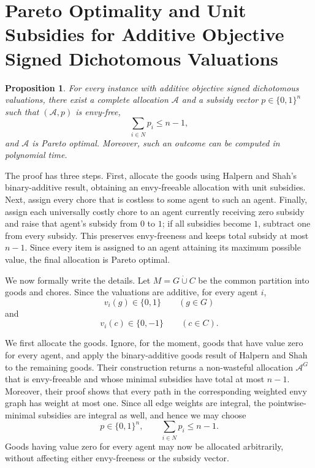\documentclass[11pt]{article}
\makeatletter
\theoremstyle{plain}
\newtheorem{proposition}{Proposition}
\theoremstyle{plain}
\renewenvironment{proof}[1][\proofname]{\par
  \pushQED{\qed}%
  \normalfont \topsep6\p@\@plus6\p@\relax
  \trivlist
  \item[\hskip\labelsep\bfseries #1\@addpunct{}]\ignorespaces
}{%
  \popQED\endtrivlist\@endpefalse
}
\newcommand{\alloc}{\mathcal{A}}              %
\makeatother
\begin{document}
\section{Pareto Optimality and Unit Subsidies for Additive Objective Signed Dichotomous Valuations}
\label{app:additive-objective-po}
\begin{proposition}
\label{prop:additive-objective-po}
For every instance with additive objective signed dichotomous valuations, there exist a complete allocation $\alloc$ and a subsidy vector $p\in\{0,1\}^n$ such that $(\alloc,p)$ is envy-free,
\[
\sum_{i\in N}p_i\leq n-1,
\]
and $\alloc$ is Pareto optimal. Moreover, such an outcome can be computed in polynomial time.
\end{proposition}

\begin{proof}
The proof has three steps. First, allocate the goods using Halpern and Shah's binary-additive result, obtaining an envy-freeable allocation with unit subsidies. Next, assign every chore that is costless to some agent to such an agent. Finally, assign each universally costly chore to an agent currently receiving zero subsidy and raise that agent's subsidy from $0$ to $1$; if all subsidies become $1$, subtract one from every subsidy. This preserves envy-freeness and keeps total subsidy at most $n-1$. Since every item is assigned to an agent attaining its maximum possible value, the final allocation is Pareto optimal.


We now formally write the details. Let $M=G\mathbin{\dot\cup}C$ be the common partition into goods and chores. Since the valuations are additive, for every agent $i$,
\[
v_i(g)\in\{0,1\}\qquad (g\in G)
\]
and
\[
v_i(c)\in\{0,-1\}\qquad (c\in C).
\]

We first allocate the goods. Ignore, for the moment, goods that have value zero for every agent, and apply the binary-additive goods result of Halpern and Shah~\cite{HS19} to the remaining goods. Their construction returns a non-wasteful allocation $\alloc^G$ that is envy-freeable and whose minimal subsidies have total at most $n-1$. Moreover, their proof shows that every path in the corresponding weighted envy graph has weight at most one. Since all edge weights are integral, the pointwise-minimal subsidies are integral as well, and hence we may choose
\[
p\in\{0,1\}^n,
\qquad
\sum_{i\in N}p_i\leq n-1.
\]
Goods having value zero for every agent may now be allocated arbitrarily, without affecting either envy-freeness or the subsidy vector.


\end{proof}
\end{document}
